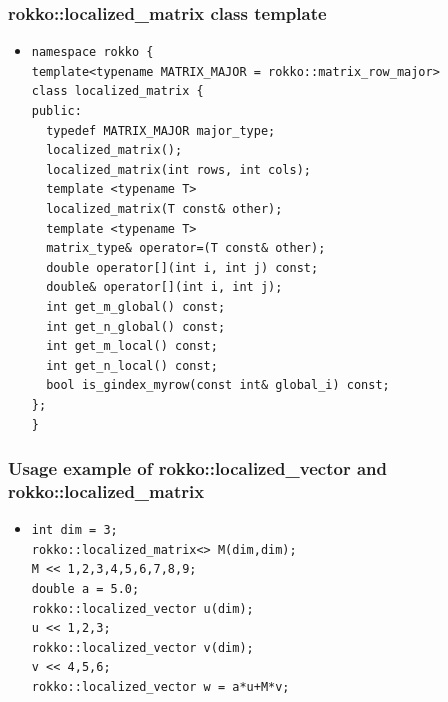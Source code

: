 \begin{frame}[c,fragile]
  \frametitle{rokko::localized\_matrix class template}
  \begin{itemize}
  \item {}
\begin{lstlisting}
namespace rokko {
template<typename MATRIX_MAJOR = rokko::matrix_row_major>
class localized_matrix {
public:
  typedef MATRIX_MAJOR major_type;
  localized_matrix();
  localized_matrix(int rows, int cols);
  template <typename T>
  localized_matrix(T const& other);
  template <typename T>
  matrix_type& operator=(T const& other);
  double operator[](int i, int j) const;
  double& operator[](int i, int j);
  int get_m_global() const;
  int get_n_global() const;
  int get_m_local() const;
  int get_n_local() const;
  bool is_gindex_myrow(const int& global_i) const;
};
}
\end{lstlisting}
  \end{itemize}
\end{frame}

\begin{frame}[c,fragile]
  \frametitle{Usage example of rokko::localized\_vector and rokko::localized\_matrix}
  \begin{itemize}
  \item {}
\begin{lstlisting}
int dim = 3;
rokko::localized_matrix<> M(dim,dim);
M << 1,2,3,4,5,6,7,8,9;
double a = 5.0;
rokko::localized_vector u(dim);
u << 1,2,3;
rokko::localized_vector v(dim);
v << 4,5,6;
rokko::localized_vector w = a*u+M*v;
\end{lstlisting}
  \end{itemize}
\end{frame}

